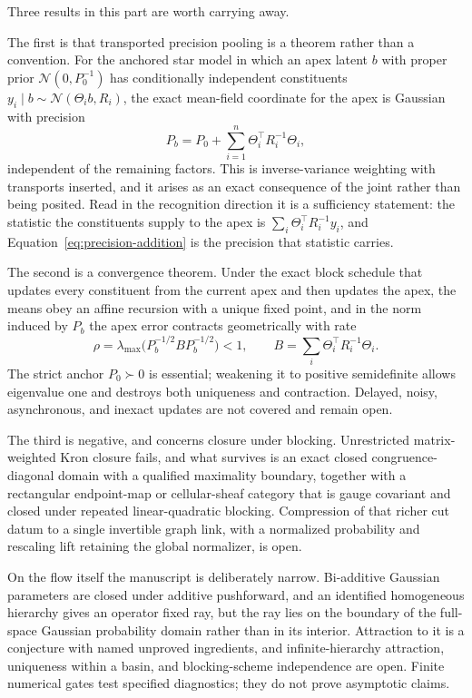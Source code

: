 \documentclass[11pt,letterpaper]{article}
\begin{document}
Three results in this part are worth carrying away.

The first is that transported precision pooling is a theorem rather than a convention. For the anchored star model in which an apex latent \(b\) with proper prior \(\mathcal N(0,P_0^{-1})\) has conditionally independent constituents \(y_i\mid b\sim\mathcal N(\Theta_ib,R_i)\), the exact mean-field coordinate for the apex is Gaussian with precision
\begin{equation}
  P_b=P_0+\sum_{i=1}^n\Theta_i^\top R_i^{-1}\Theta_i,
  \label{eq:precision-addition}
\end{equation}
independent of the remaining factors. This is inverse-variance weighting with transports inserted, and it arises as an exact consequence of the joint rather than being posited. Read in the recognition direction it is a sufficiency statement: the statistic the constituents supply to the apex is \(\sum_i\Theta_i^\top R_i^{-1}y_i\), and Equation~\eqref{eq:precision-addition} is the precision that statistic carries.

The second is a convergence theorem. Under the exact block schedule that updates every constituent from the current apex and then updates the apex, the means obey an affine recursion with a unique fixed point, and in the norm induced by \(P_b\) the apex error contracts geometrically with rate
\begin{equation}
  \rho=\lambda_{\max}\bigl(P_b^{-1/2}BP_b^{-1/2}\bigr)<1,
  \qquad
  B=\sum_i\Theta_i^\top R_i^{-1}\Theta_i.
  \label{eq:contraction}
\end{equation}
The strict anchor \(P_0\succ0\) is essential; weakening it to positive semidefinite allows eigenvalue one and destroys both uniqueness and contraction. Delayed, noisy, asynchronous, and inexact updates are not covered and remain open.

The third is negative, and concerns closure under blocking. Unrestricted matrix-weighted Kron closure fails, and what survives is an exact closed congruence-diagonal domain with a qualified maximality boundary, together with a rectangular endpoint-map or cellular-sheaf category that is gauge covariant and closed under repeated linear-quadratic blocking. Compression of that richer cut datum to a single invertible graph link, with a normalized probability and rescaling lift retaining the global normalizer, is open.

On the flow itself the manuscript is deliberately narrow. Bi-additive Gaussian parameters are closed under additive pushforward, and an identified homogeneous hierarchy gives an operator fixed ray, but the ray lies on the boundary of the full-space Gaussian probability domain rather than in its interior. Attraction to it is a conjecture with named unproved ingredients, and infinite-hierarchy attraction, uniqueness within a basin, and blocking-scheme independence are open. Finite numerical gates test specified diagnostics; they do not prove asymptotic claims.
\end{document}
